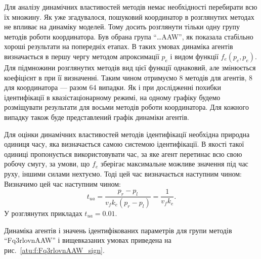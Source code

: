 Для аналізу динамічних властивостей методів немає необхідності
перебирати всю їх множину. Як уже згадувалося, пошуковий
координатор в розглянутих методах не впливає на динаміку
моделей. Тому досить розглянути тільки одну групу методів роботи
координатора. Був обрана група ``\ldots{}AAW'', як показала стабільно
хороші результати на попередніх етапах. В таких умовах динаміка
агентів визначається в першу чергу методом апроксимації
$ p_e $ і видом функції
$ f_e (p_c, p_e) $. Для підмножини розглянутих методів вид цієї функції
однаковий, але змінюється коефіцієнт в при її визначенні. Таким
чином отримуємо 8 методів для агентів, 8 для координатора ---
разом 64 випадки. Як і при дослідженні похибки ідентифікації в
квазістаціонарному режимі, на одному графіку будемо розміщувати
результати для восьми методів роботи координатора. Для кожного
випадку також буде представлений графік динаміки агентів.

Для оцінки динамічних властивостей методів ідентифікації необхідна природна
одиниця часу, яка визначається самою системою ідентифікації.
В якості такої
одиниці пропонується використовувати час, за яке агент перетинає всю свою
робочу смугу, за умови, що $f_e$ зберігає максимальне можливе значення під
час руху, іншими силами нехтуємо. Тоді цей час визначається наступним чином:
Визначимо цей час  наступним чином:
%
\begin{equation}
  t_{ua} = \frac{p_r - p_l}{ v_f k_e (p_r - p_l)} = \frac{1}{v_f k_e}.
  \label{atu:eq:t_ua}
\end{equation}
%
У розглянутих прикладах $t_{ua} = 0.01$.

Динаміка агентів і значень ідентифікованих параметрів для групи методів
``Fq3rlovnAAW'' і вищевказаних умовах приведена на рис.~\ref{atu:f:Fq3rlovnAAW_sign}.


